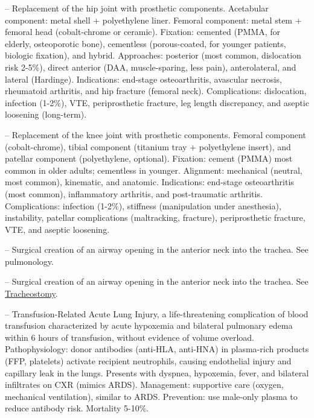 -- Replacement of the hip joint with prosthetic components. Acetabular component: metal shell + polyethylene liner. Femoral component: metal stem + femoral head (cobalt-chrome or ceramic). Fixation: cemented (PMMA, for elderly, osteoporotic bone), cementless (porous-coated, for younger patients, biologic fixation), and hybrid. Approaches: posterior (most common, dislocation risk 2-5\%), direct anterior (DAA, muscle-sparing, less pain), anterolateral, and lateral (Hardinge). Indications: end-stage osteoarthritis, avascular necrosis, rheumatoid arthritis, and hip fracture (femoral neck). Complications: dislocation, infection (1-2\%), VTE, periprosthetic fracture, leg length discrepancy, and aseptic loosening (long-term).

-- Replacement of the knee joint with prosthetic components. Femoral component (cobalt-chrome), tibial component (titanium tray + polyethylene insert), and patellar component (polyethylene, optional). Fixation: cement (PMMA) most common in older adults; cementless in younger. Alignment: mechanical (neutral, most common), kinematic, and anatomic. Indications: end-stage osteoarthritis (most common), inflammatory arthritis, and post-traumatic arthritis. Complications: infection (1-2\%), stiffness (manipulation under anesthesia), instability, patellar complications (maltracking, fracture), periprosthetic fracture, VTE, and aseptic loosening.

-- Surgical creation of an airway opening in the anterior neck into the trachea. See pulmonology.

-- Surgical creation of an airway opening in the anterior neck into the trachea. See \hyperlink{Tracheostomy}{Tracheostomy}.

-- Transfusion-Related Acute Lung Injury, a life-threatening complication of blood transfusion characterized by acute hypoxemia and bilateral pulmonary edema within 6 hours of transfusion, without evidence of volume overload. Pathophysiology: donor antibodies (anti-HLA, anti-HNA) in plasma-rich products (FFP, platelets) activate recipient neutrophils, causing endothelial injury and capillary leak in the lungs. Presents with dyspnea, hypoxemia, fever, and bilateral infiltrates on CXR (mimics ARDS). Management: supportive care (oxygen, mechanical ventilation), similar to ARDS. Prevention: use male-only plasma to reduce antibody risk. Mortality 5-10\%.

